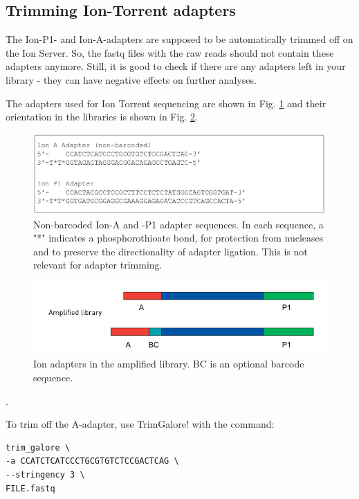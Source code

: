 \documentclass[11pt]{article}
\begin{document}
\subsection{Trimming Ion-Torrent adapters}
\label{sec:orgheadline3}

The Ion-P1- and Ion-A-adapters are supposed to be automatically
trimmed off on the Ion Server. So, the fastq files with the raw reads
should not contain these adapters anymore. Still, it is good to check
if there are any adapters left in your library - they can have
negative effects on further analyses.



The adapters used for Ion Torrent sequencing are shown in
Fig. \ref{fig:orgparagraph2} and their orientation in the libraries is shown
in Fig. \ref{fig:orgparagraph3}.

\begin{figure}[htb]
\centering
\includegraphics[width=14cm]{IonAdapters.png}
\caption{\label{fig:orgparagraph2}
Non-barcoded Ion-A and -P1 adapter sequences. In each sequence, a "*" indicates a phosphorothioate bond, for protection from nucleases and to preserve the directionality of adapter ligation. This is not relevant for adapter trimming.}
\end{figure}

\begin{figure}[htb]
\centering
\includegraphics[width=14cm]{IonLibraryWithAdapters.png}
\caption{\label{fig:orgparagraph3}
Ion adapters in the amplified library. BC is an optional barcode sequence.}
\end{figure}.

To trim off the A-adapter, use TrimGalore! with the command:

\begin{verbatim}
trim_galore \
-a CCATCTCATCCCTGCGTGTCTCCGACTCAG \
--stringency 3 \
FILE.fastq
\end{verbatim}
\end{document}
